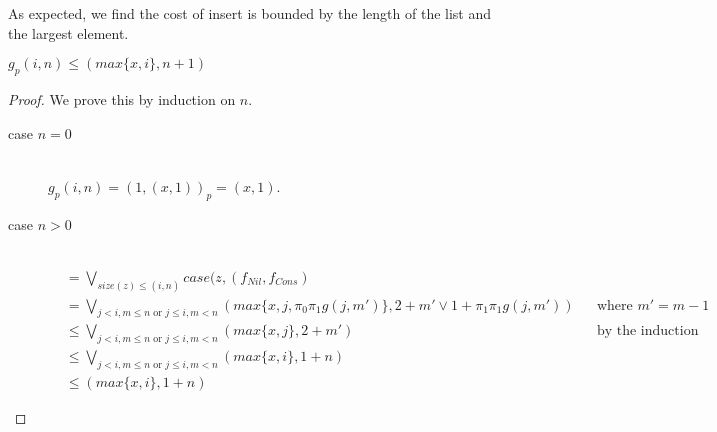 As expected, we find the cost of insert is bounded by the length of the list and the largest element.

\begin{lemma}
  \label{lem:insert_rec_potential}
  $g_p(i,n) \leq (max\{x, i\}, n+1)$
\end{lemma}
\begin{proof}
  We prove this by induction on $n$.
  \begin{description}
    \item[case $n=0$]\hfill \\
      $g_p(i,n) = (1, (x, 1))_p = (x, 1)$.
    \item[case $n>0$]\hfill \\
      \begin{align*}
        &= \bigvee_{size(z) \leq (i,n)} case(z, (f_{Nil}, f_{Cons}) &&\\
        &= \bigvee_{j < i, m \leq n \text{ or } j \leq i, m < n} (max\{x, j, \pi_0\pi_1g(j, m')\}, 2 + m' \vee 1 + \pi_1\pi_1g(j, m')) && \text{where $m' = m - 1$}\\
        &\leq \bigvee_{j < i, m \leq n \text{ or } j \leq i, m < n} (max\{x, j\}, 2 + m')&&\text{by the induction hypothesis}\\
        &\leq \bigvee_{j < i, m \leq n \text{ or } j \leq i, m < n} (max\{x,i\}, 1 + n)&&\\
        &\leq (max\{x,i\}, 1 + n)&&
      \end{align*}
  \end{description}
\end{proof}

